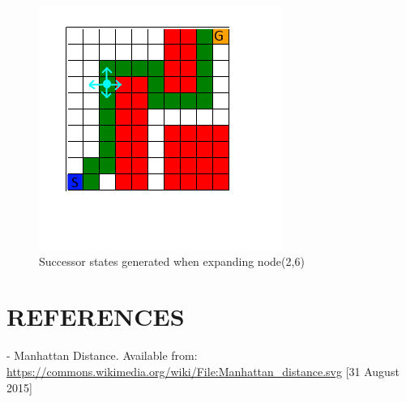 \documentclass[11pt]{article}
\begin{document}
\begin{figure}[h]
\includegraphics[scale=1.0]{Generate_Successor_States.png}
\caption{Successor states generated when expanding node(2,6)}
\end{figure}

\section*{REFERENCES}
- Manhattan Distance. Available from: \url{https://commons.wikimedia.org/wiki/File:Manhattan_distance.svg} [31 August 2015]
\end{document}
